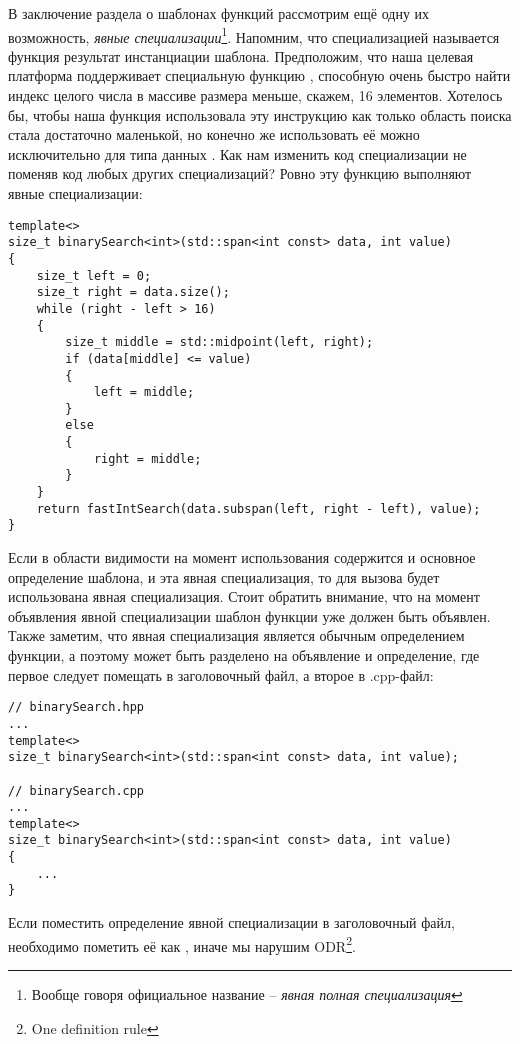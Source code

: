 В заключение раздела о шаблонах функций рассмотрим ещё одну их возможность, \textit{явные специализации}\footnote{Вообще говоря официальное название -- \textit{явная полная специализация}}. Напомним, что специализацией называется функция результат инстанциации шаблона. Предположим, что наша целевая платформа поддерживает специальную функцию , способную очень быстро найти индекс целого числа в массиве размера меньше, скажем, 16 элементов. Хотелось бы, чтобы наша функция  использовала эту инструкцию как только область поиска стала достаточно маленькой, но конечно же использовать её можно исключительно для типа данных . Как нам изменить код специализации  не поменяв код любых других специализаций? Ровно эту функцию выполняют явные специализации:
\begin{verbatim}
template<>
size_t binarySearch<int>(std::span<int const> data, int value)
{
    size_t left = 0;
    size_t right = data.size();
    while (right - left > 16)
    {
        size_t middle = std::midpoint(left, right);
        if (data[middle] <= value)
        {
            left = middle;
        }
        else
        {
            right = middle;
        }
    }
    return fastIntSearch(data.subspan(left, right - left), value);
}
\end{verbatim}
Если в области видимости на момент использования  содержится и основное определение шаблона, и эта явная специализация, то для вызова будет использована явная специализация. Стоит обратить внимание, что на момент объявления явной специализации шаблон функции уже должен быть объявлен. Также заметим, что явная специализация является обычным определением функции, а поэтому может быть разделено на объявление и определение, где первое следует помещать в заголовочный файл, а второе в .cpp-файл:
\begin{verbatim}
// binarySearch.hpp
...
template<>
size_t binarySearch<int>(std::span<int const> data, int value);

// binarySearch.cpp
...
template<>
size_t binarySearch<int>(std::span<int const> data, int value)
{
    ...
}
\end{verbatim}
Если поместить определение явной специализации в заголовочный файл, необходимо пометить её как , иначе мы нарушим ODR\footnote{One definition rule}.


